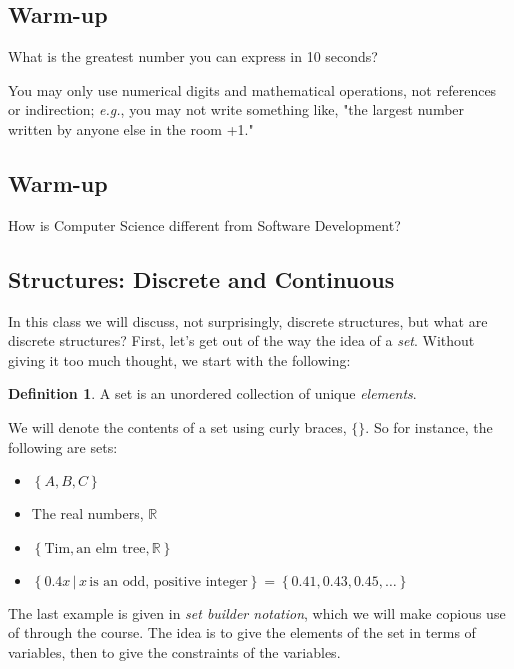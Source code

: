 \documentclass[12pt, letterpaper]{article}
\theoremstyle{definition}
\newtheorem{defn}{Definition}
\begin{document}
\subsection*{Warm-up}

\vspace*{1in}\noindent
What is the greatest number you can express in 10 seconds?

\vspace*{0.4in}\noindent
You may only use numerical digits and mathematical operations, not references
or indirection; \emph{e.g.}, you may not write something like, "the largest
number written by anyone else in the room +1."

\clearpage\pagebreak
\subsection*{Warm-up}

\vspace*{1in}\noindent
How is Computer Science different from Software Development?

\clearpage\pagebreak
\subsection*{Structures: Discrete and Continuous}

In this class we will discuss, not surprisingly, discrete structures, but
what are discrete structures? First, let's get out of the way the idea of a
\emph{set}. Without giving it too much thought, we start with the following:

\begin{defn}
    A set is an unordered collection of unique \emph{elements}.
\end{defn}
\noindent We will denote the contents of a set using curly braces, $\{\}$.
So for instance, the following are sets:

\begin{itemize}[label={}]
    \item $\left\{ A, B, C \right\}$
    \item The real numbers, $\mathbb{R}$
    \item $\left\{ \text{Tim}, \text{an elm tree}, \mathbb{R} \right\}$
    \item $\left\{ 0.4x \, | \, x \, \text{is an odd, positive integer} \right\} = \left\{ 0.41, 0.43, 0.45, \dots \right\}$
\end{itemize}

The last example is given in \emph{set builder notation}, which we will make
copious use of through the course. The idea is to give the elements of the set
in terms of variables, then to give the constraints of the variables.
\end{document}
